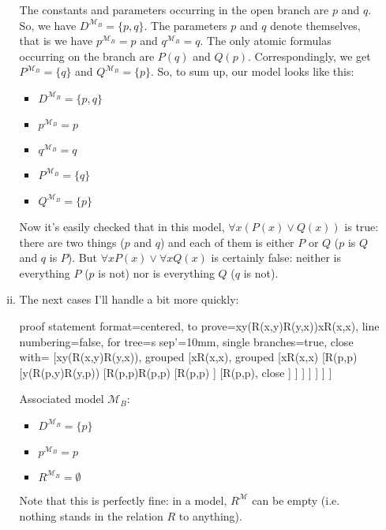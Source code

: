 \begin{enumerate}[\thesection.1]
\begin{enumerate}[(i)]
The constants and parameters occurring in the open branch are $p$ and $q$. So, we have $D^{\mathcal{M}_B}=\{p,q\}$. The parameters $p$ and $q$ denote themselves, that is we have $p^{\mathcal{M}_B}=p$ and $q^{\mathcal{M}_B}=q$. The only atomic formulas occurring on the branch are $P(q)$ and $Q(p)$. Correspondingly, we get $P^{\mathcal{M}_B}=\{q\}$ and $Q^{\mathcal{M}_B}=\{p\}$. So, to sum up, our model looks like this:
\begin{itemize}
	\item $D^{\mathcal{M}_B}=\{p,q\}$
	\item $p^{\mathcal{M}_B}=p$
	\item $q^{\mathcal{M}_B}=q$
	\item $P^{\mathcal{M}_B}=\{q\}$
 	\item $Q^{\mathcal{M}_B}=\{p\}$
\end{itemize}
Now it's easily checked that in this model, $\forall x(P(x)\lor Q(x))$ is true: there are two things ($p$ and $q$) and each of them is either $P$ or $Q$ ($p$ is $Q$ and $q$ is $P$). But $\forall xP(x)\lor \forall xQ(x)$ is certainly false: neither is everything $P$ ($p$ is not) nor is everything $Q$ ($q$ is not). 

	\item The next cases I'll handle a bit more quickly:
	
	\begin{prooftree}
{
proof statement format={centered},
to prove={\forall x\forall y(R(x,y)\to R(y,x))\nvdash \forall xR(x,x)},
line numbering=false,
for tree={s sep'=10mm},
single branches=true,
close with=\xmark
}
[{\forall x\forall y(R(x,y)\to R(y,x))}, grouped
	[{\neg \forall xR(x,x)}, grouped
		[{\exists x\neg R(x,x)}
			[{\neg R(p,p)}
				[{\forall y(R(p,y)\to R(y,p))}
					[{R(p,p)\to R(p,p)}
						[{\neg R(p,p)} ]
						[{R(p,p)}, close ]
					]
				]
			]
		]
	]
]
\end{prooftree}

Associated model $\mathcal{M}_B$:

\begin{itemize}
	\item $D^{\mathcal{M}_B}=\{p\}$
	\item $p^{\mathcal{M}_B}=p$
	\item $R^{\mathcal{M}_B}=\emptyset$
\end{itemize}

Note that this is perfectly fine: in a model, $R^\mathcal{M}$ can be empty (i.e. nothing stands in the relation $R$ to anything).


\end{enumerate}
\end{enumerate}
